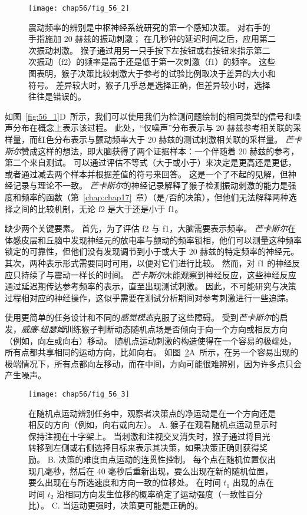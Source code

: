 \begin{figure}[htbp]
	\centering
	\texttt{[image: chap56/fig\_56\_2]}
	\caption{震动频率的辨别是中枢神经系统研究的第一个感知决策。
		对右手的手指施加 20 赫兹的振动刺激；
		在几秒钟的延迟时间之后，应用第二次振动刺激。
		猴子通过用另一只手按下左按钮或右按钮来指示第二次振动（f2）的频率是高于还是低于第一次刺激（f1）的频率。
		这些图表明，猴子决策比较刺激大于参考的试验比例取决于差异的大小和符号。
		差异较大时，猴子几乎总是选择正确，但差异较小时，选择往往是错误的\cite{romo2001touch}。}
	\label{fig:56_2}
\end{figure}


如图~\ref{fig:56_1}D~所示，我们可以使用我们为检测问题绘制的相同类型的信号和噪声分布在概念上表示该过程。
此处，“仅噪声”分布表示与 20 赫兹参考相关联的采样量，而红色分布表示与颤动频率大于 20 赫兹的测试刺激相关联的采样量。
\textit{芒卡斯尔}赞成这样的想法，即大脑获得了两个证据样本：一个伴随着 20 赫兹的参考，第二个来自测试。
可以通过评估不等式（大于或小于）来决定是更高还是更低，或者通过减去两个样本并根据差值的符号来回答。
这是一个了不起的见解，但神经记录与理论不一致。
\textit{芒卡斯尔}的神经记录解释了猴子检测振动刺激的能力是强度和频率的函数（第~\ref{chap:chap17}~章）（是/否的决策），但他们无法解释两种选择之间的比较机制，无论 f2 是大于还是小于 f1。


缺少两个关键要素。
首先，为了评估 f2 与 f1，大脑需要表示频率。
\textit{芒卡斯尔}在体感皮层和丘脑中发现神经元的放电率与颤动的频率锁相，他们可以测量这种频率锁定的可靠性，但他们没有发现调节到小于或大于 20 赫兹的特定频率的神经元。
其次，两种表示形式需要同时可用，以便对它们进行比较。
然而，对 f1 的神经反应只持续了与震动一样长的时间。
\textit{芒卡斯尔}未能观察到神经反应，这些神经反应通过延迟期传达参考频率的表示，直至出现测试刺激。
因此，不可能研究与决策过程相对应的神经操作，这似乎需要在测试分析期间对参考刺激进行一些追踪。


使用更简单的任务设计和不同的\textit{感觉模态}克服了这些障碍。
受到\textit{芒卡斯尔}的启发，\textit{威廉$\cdot$纽瑟姆}训练猴子判断动态随机点场是否倾向于向一个方向或相反方向（例如，向左或向右）移动。
随机点运动刺激的构造使得在一个容易的极端处，所有点都共享相同的运动方向，比如向右。
如图~\ref{fig:56_3}A~所示，在另一个容易出现的极端情况下，所有点都向左移动，而在中间，方向可能很难辨别，因为许多点只会产生噪声。


\begin{figure}[htbp]
	\centering
	\texttt{[image: chap56/fig\_56\_3]}
	\caption{在随机点运动辨别任务中，观察者决策点的净运动是在一个方向还是相反的方向（例如，向右或向左）。
		A. 猴子在观看随机点运动显示时保持注视在十字架上。
		当刺激和注视交叉消失时，猴子通过将目光转移到左侧或右侧选择目标来表示其决策，如果决策正确则获得奖励。
		B. 决策的难度由点运动的连贯性控制。
		每个点在随机位置仅出现几毫秒，然后在 40 毫秒后重新出现，要么出现在新的随机位置，要么出现在与所选速度和方向一致的位移处。
		在时间 $t_1$ 出现的点在时间 $t_2$ 沿相同方向发生位移的概率确定了运动强度（一致性百分比）\cite{britten1992analysis}。
		C. 当运动更强时，决策更可能是正确的。}
	\label{fig:56_3}
\end{figure}


